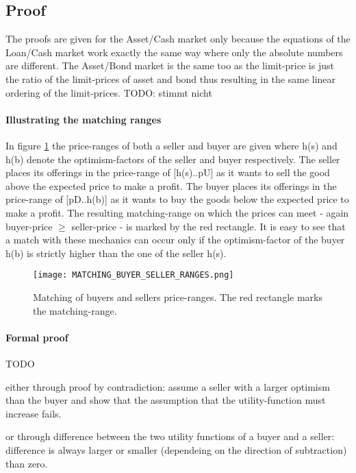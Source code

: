 \documentclass[Bachelorarbeit.tex]{subfiles}
\begin{document}
\subsection{Proof}
The proofs are given for the Asset/Cash market only because the equations of the Loan/Cash market work exactly the same way where only the absolute numbers are different. The Asset/Bond market is the same too as the limit-price is just the ratio of the limit-prices of asset and bond thus resulting in the same linear ordering of the limit-prices. TODO: stimmt nicht

\paragraph{Illustrating the matching ranges}
In figure \ref{fig:MATCHING_BUYER_SELLER_RANGES} the price-ranges of both a seller and buyer are given where h(s) and h(b) denote the optimism-factors of the seller and buyer respectively. The seller places its offerings in the price-range of [h(s)..pU] as it wants to sell the good above the expected price to make a profit. The buyer places its offerings in the price-range of [pD..h(b)] as it wants to buy the goods below the expected price to make a profit. The resulting matching-range on which the prices can meet - again buyer-price $\geq$ seller-price - is marked by the red rectangle. It is easy to see that a match with these mechanics can occur only if the optimism-factor of the buyer h(b) is strictly higher than the one of the seller h(s).

\begin{figure}[H]
	\centering
  \texttt{[image: MATCHING\_BUYER\_SELLER\_RANGES.png]}
  	\caption{Matching of buyers and sellers price-ranges. The red rectangle marks the matching-range.}
	\label{fig:MATCHING_BUYER_SELLER_RANGES}
\end{figure}

\paragraph{Formal proof}
TODO

either through proof by contradiction: assume a seller with a larger optimism than the buyer and show that the assumption that the utility-function must increase fails.

or through difference between the two utility functions of a buyer and a seller: difference is always larger or smaller (dependeing on the direction of subtraction) than zero.
\end{document}
